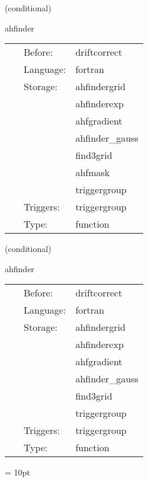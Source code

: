 \vspace{5mm}

   (conditional) 

\hspace{5mm} ahfinder 

\hspace{5mm}{\it call apparent horizon finder } 


\hspace{5mm}

 \begin{tabular*}{160mm}{cll} 
~ & Before:  & driftcorrect \\ 
~ & Language:  & fortran \\ 
~ & Storage:  & ahfindergrid \\ 
~& ~ &ahfinderexp\\ 
~& ~ &ahfgradient\\ 
~& ~ &ahfinder\_gauss\\ 
~& ~ &find3grid\\ 
~& ~ &ahfmask\\ 
~& ~ &triggergroup\\ 
~ & Triggers:  & triggergroup \\ 
~ & Type:  & function \\ 
\end{tabular*} 


\vspace{5mm}

   (conditional) 

\hspace{5mm} ahfinder 

\hspace{5mm}{\it call apparent horizon finder with persisting mask } 


\hspace{5mm}

 \begin{tabular*}{160mm}{cll} 
~ & Before:  & driftcorrect \\ 
~ & Language:  & fortran \\ 
~ & Storage:  & ahfindergrid \\ 
~& ~ &ahfinderexp\\ 
~& ~ &ahfgradient\\ 
~& ~ &ahfinder\_gauss\\ 
~& ~ &find3grid\\ 
~& ~ &triggergroup\\ 
~ & Triggers:  & triggergroup \\ 
~ & Type:  & function \\ 
\end{tabular*} 



\vspace{5mm}\parskip = 10pt 


